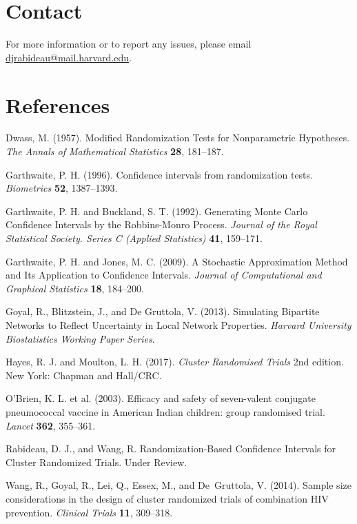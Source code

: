 \documentclass[12pt]{article}\usepackage[]{graphicx}\usepackage[]{color}
\begin{document}
\section*{Contact}
For more information or to report any issues, please email \href{mailto:djrabideau@mail.harvard.edu}{djrabideau@mail.harvard.edu}.

\section*{References}
\noindent\hangindent=15pt Dwass, M. (1957). Modified Randomization Tests for Nonparametric Hypotheses. \textit{The Annals of Mathematical Statistics} \textbf{28}, 181--187.

\noindent\hangindent=15pt Garthwaite, P. H. (1996). Confidence intervals from randomization tests. \textit{Biometrics} \textbf{52}, 1387--1393.

\noindent\hangindent=15pt Garthwaite, P. H. and Buckland, S. T. (1992). Generating Monte Carlo Confidence Intervals by the Robbins-Monro Process. \textit{Journal of the Royal Statistical Society. Series C (Applied Statistics)} \textbf{41}, 159--171.

\noindent\hangindent=15pt Garthwaite, P. H. and Jones, M. C. (2009). A Stochastic Approximation Method and Its Application to Confidence Intervals. \textit{Journal of Computational and Graphical Statistics} \textbf{18}, 184--200.

\noindent\hangindent=15pt Goyal, R., Blitzstein, J., and De Gruttola, V. (2013). Simulating Bipartite Networks to Reflect Uncertainty in Local Network Properties. \textit{Harvard University Biostatistics Working Paper Series}.

\noindent\hangindent=15pt Hayes, R. J. and Moulton, L. H. (2017). \textit{Cluster Randomised Trials} 2nd edition. New York: Chapman and Hall/CRC.

\noindent\hangindent=15pt O'Brien, K. L. et al. (2003). Efficacy and safety of seven-valent conjugate pneumococcal vaccine in American Indian children: group randomised trial. \textit{Lancet} \textbf{362}, 355--361.

\noindent\hangindent=15pt Rabideau, D. J., and Wang, R. Randomization-Based Confidence Intervals for Cluster Randomized Trials. Under Review.

\noindent\hangindent=15pt Wang, R., Goyal, R., Lei, Q., Essex, M., and De~Gruttola, V. (2014). Sample size considerations in the design of cluster randomized trials of combination HIV prevention. \textit{Clinical Trials} \textbf{11}, 309--318.
\end{document}
